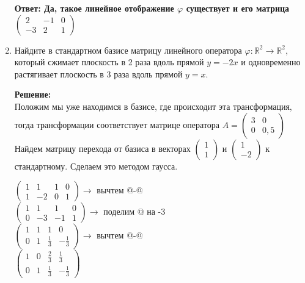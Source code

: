 \documentclass[a4paper,12pt]{article}
\makeatletter
\newcommand*{\rom}[1]{\expandafter\@slowromancap\romannumeral #1@}
\makeatother
\begin{document}
\begin{enumerate}
\textbf{Ответ: Да, такое линейное отображение $\varphi$ существует и его матрица $\begin{pmatrix}
2&-1&0\\
-3&2&1
\end{pmatrix}$}

\item Найдите в стандартном базисе матрицу линейного оператора $\varphi\colon \mathbb R^2\to \mathbb R^2$, который сжимает плоскость в 2 раза вдоль прямой $y = -2x$ и одновременно растягивает плоскость в 3 раза вдоль прямой $y = x$.

\vspace{5pt}


\textbf{Решение:}\\
Положим мы  уже находимся в базисе, где происходит эта трансформация, тогда трансформации соответствует матрице оператора  $A = \begin{pmatrix}{3}&{0}\\{0}&{0,5}\end{pmatrix}$
Найдем матрицу перехода от базиса в векторах $\begin{pmatrix}
{1}\\{1}
\end{pmatrix}$ и $\begin{pmatrix}
{1}\\{-2}
\end{pmatrix}$ к стандартному. Сделаем это методом гаусса.

$
\left(\begin{array}{cc|cc}  
1&1&1&0\\
1&-2&0&1
\end{array}\right) \rightarrow$ вычтем \rom{2}-\rom{1} \\
$
\left(\begin{array}{cc|cc}  
1&1&1&0\\
0&-3&-1&1
\end{array}\right) \rightarrow$ поделим \rom{2} на -3 \\
$
\left(\begin{array}{cc|cc}  
1&1&1&0\\
0&1&\frac{1}{3}&-\frac{1}{3}
\end{array}\right) \rightarrow$ вычтем \rom{1}-\rom{2} \\
$
\left(\begin{array}{cc|cc}  
1&0&\frac{2}{3}&\frac{1}{3}\\
0&1&\frac{1}{3}&-\frac{1}{3}
\end{array}\right)$


\end{enumerate}
\end{document}
